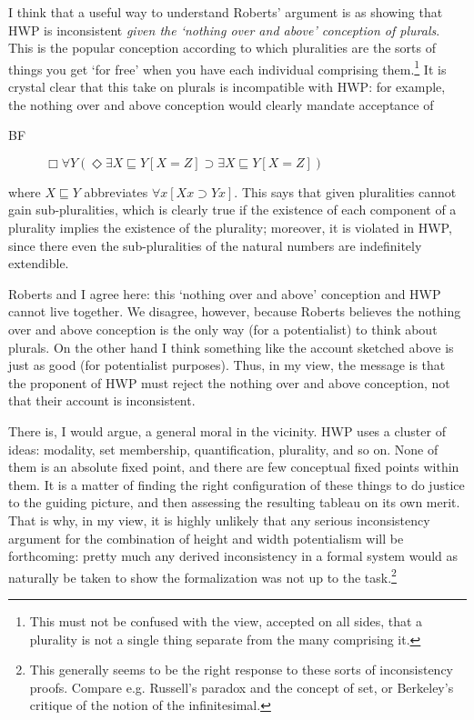 \documentclass{article}
\begin{document}
I think that a useful way to understand Roberts' argument is as showing
that HWP is inconsistent \emph{given the 
`nothing over and above' conception of plurals}. This is the popular conception 
according to which pluralities are the sorts of things you get `for free'
when you have each individual comprising them.\footnote{This must not be confused with 
the view, accepted on all sides, that a plurality is not a single thing 
separate from the many comprising it.} It is crystal 
clear that this take on plurals is incompatible with HWP: for example, 
the nothing over and above conception would clearly mandate acceptance of 
\begin{description}
    \item[BF] $\Box \forall Y (\Diamond \exists X \sqsubseteq Y [X = Z] \supset \exists X \sqsubseteq Y[X = Z])$
\end{description}
where $X \sqsubseteq Y$ abbreviates $\forall x[Xx \supset Yx]$. 
This says that given pluralities cannot gain sub-pluralities, which 
is clearly true if the existence of each component of a plurality 
implies the existence of the plurality; moreover, it is violated 
in HWP, since there even the sub-pluralities of the natural numbers are indefinitely 
extendible.

Roberts and I agree here:
this `nothing over and above' conception and HWP cannot live together.
We disagree, however, because Roberts believes the nothing over and above 
conception is the only way (for a potentialist) to think about plurals.
On the other hand I think something like the account sketched above is 
just as good (for potentialist purposes). Thus, in my view, 
the message is that the proponent of HWP must reject the nothing over and 
above conception, not that their account is inconsistent.

There is, I would argue, a general moral in the vicinity.
HWP uses a cluster of ideas: modality, set membership, quantification, plurality, 
and so on. None of them is an absolute fixed point, and there are few 
conceptual fixed points within them. It is a matter of finding the right configuration 
of these things to do justice to the guiding picture, and then assessing 
the resulting tableau on its own merit. That is why, in my view,
it is highly unlikely that any serious inconsistency argument for the combination of
height and width potentialism will be forthcoming: 
pretty much any derived inconsistency  in a formal system would as naturally 
be taken to show 
the formalization was not up to the task.\footnote{This 
generally seems to be the right response to these sorts of inconsistency proofs.
Compare e.g. Russell's paradox and the concept of set, or Berkeley's 
critique of the notion of the infinitesimal.}
\end{document}
